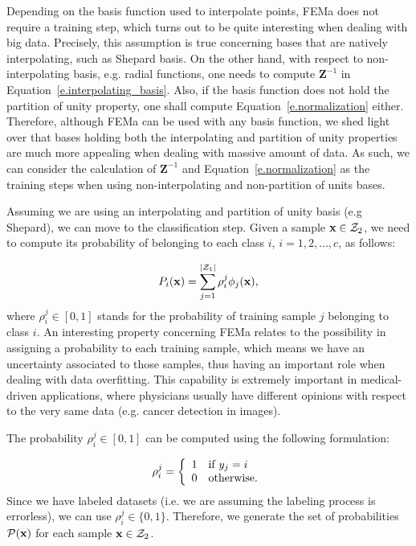 Depending on the basis function used to interpolate points, FEMa does not require a training step, which turns out to be quite interesting when dealing with big data. Precisely, this assumption is true concerning bases that are natively interpolating, such as Shepard basis. On the other hand, with respect to non-interpolating basis, e.g. radial functions, one needs to compute $\textbf{Z}^{-1}$ in Equation~\ref{e.interpolating_basis}. Also, if the basis function does not hold the partition of unity property, one shall compute Equation~\ref{e.normalization} either. Therefore, although FEMa can be used with any basis function, we shed light over that bases holding both the interpolating and partition of unity properties are much more appealing when dealing with massive amount of data. As such, we can consider the calculation of $\textbf{Z}^{-1}$ and Equation~\ref{e.normalization} as the training steps when using non-interpolating and non-partition of units bases.

Assuming we are using an interpolating and partition of unity basis (e.g Shepard), we can move to the classification step. Given a sample $\textbf{x}\in{\cal Z}_2$, we need to compute its probability of belonging to each class $i$, $i=1,2,\ldots,c$, as follows:

\begin{equation}
	P_i(\textbf{x})=\sum_{j=1}^{\left|{\cal Z}_1\right|}\rho_i^j\phi_j(\textbf{x}),
\end{equation}
where $\rho_i^j\in[0,1]$ stands for the probability of training sample $j$ belonging to class $i$. An interesting property concerning FEMa relates to the possibility in assigning a probability to each training sample, which means we have an uncertainty associated to those samples, thus having an important role when dealing with data overfitting. This capability is extremely important in medical-driven applications, where physicians usually have different opinions with respect to the very same data (e.g. cancer detection in images).

The probability $\rho_i^j\in[0,1]$ can be computed using the following formulation:

\begin{equation}
\rho_i^j =  \left\{
			  \begin{array}{ll}
			      1 & \hbox{if $y_{j} = i$}\\
			      0 & \hbox{otherwise.}\\
			  \end{array}
		    \right.
\end{equation}
Since we have labeled datasets (i.e. we are assuming the labeling process is errorless), we can use $\rho_i^j\in\{0,1\}$. Therefore, we generate the set of probabilities ${\cal P}(\textbf{x})$ for each sample $\textbf{x}\in{\cal Z}_2$. 

